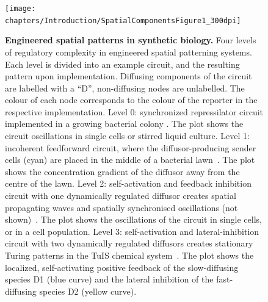 \begin{figure}[H]
    \centering
    \texttt{[image: chapters/Introduction/SpatialComponentsFigure1\_300dpi]}
    \caption[\textbf{Engineered spatial patterns in synthetic biology.}]{\textbf{Engineered spatial patterns in synthetic biology.} Four levels of regulatory complexity in engineered spatial patterning systems. Each level is divided into an example circuit, and the resulting pattern upon implementation. Diffusing components of the circuit are labelled with a “D”, non-diffusing nodes are unlabelled. The colour of each node corresponds to the colour of the reporter in the respective implementation. Level 0: synchronized repressilator circuit implemented in a growing bacterial colony \parencite{Potvin-Trottier2016}. The plot shows the circuit oscillations in single cells or stirred liquid culture. Level 1: incoherent feedforward circuit, where the diffusor-producing sender cells (cyan) are placed in the middle of a bacterial lawn~\parencite{Basu2005}. The plot shows the concentration gradient of the diffusor away from the centre of the lawn. Level 2: self-activation and feedback inhibition circuit with one dynamically regulated diffusor creates spatial propagating waves and spatially synchronised oscillations (not shown)~\parencite{Danino2010}. The plot shows the oscillations of the circuit in single cells, or in a cell population. Level 3: self-activation and lateral-inhibition circuit with two dynamically regulated diffusors creates stationary Turing patterns in the TuIS chemical system~\parencite{Horvath}. The plot shows the localized, self-activating positive feedback of the slow-diffusing species D1 (blue curve) and the lateral inhibition of the fast-diffusing species D2 (yellow curve).} %
    \label{fig:engineered_patterns}
\end{figure}

